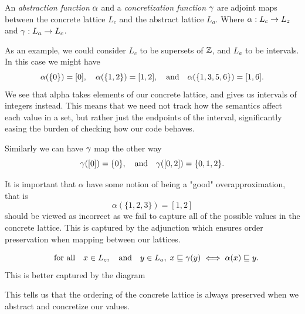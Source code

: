\begin{definition}
  An \emph{abstraction function} $\alpha$ and a \emph{concretization function} $\gamma$ are adjoint maps between the concrete lattice $L_c$ and the abstract lattice $L_a$. Where $\alpha: L_c \to L_z$ and $\gamma: L_a \to L_c$.
\end{definition}
As an example, we could consider $L_c$ to be supersets of $\mathbb{Z}$, and $L_a$ to be intervals.
In this case we might have 
\[\alpha(\{0\}) = [0], \quad \alpha(\{1, 2\}) = [1, 2], \quad \text{and} \quad \alpha(\{1, 3, 5, 6\}) = [1, 6].\]
We see that alpha takes elements of our concrete lattice, and gives us intervals of integers instead.
This means that we need not track how the semantics affect each value in a set, but rather just the endpoints of the interval, significantly easing the burden of checking how our code behaves.

Similarly we can have $\gamma$ map the other way 
\[\gamma([0]) = \{0\}, \quad \text{and} \quad \gamma([0,2]) = \{0,1,2\}.\]

It is important that $\alpha$ have some notion of being a "good" overapproximation, that is
\[\alpha(\{1, 2, 3\}) = [1, 2]\]
should be viewed as incorrect as we fail to capture all of the possible values in the concrete lattice.
This is captured by the adjunction which ensures order preservation when mapping between our lattices.

\[\quad \text{for all} \quad x \in L_c, \quad \text{and} \quad y \in L_a, \;  x \sqsubseteq \gamma(y) \iff \alpha(x) \sqsubseteq y.\]
This is better captured by the diagram

\begin{figure}[h]
\centering
{}
\end{figure}

This tells us that the ordering of the concrete lattice is always preserved when we abstract and concretize our values.

